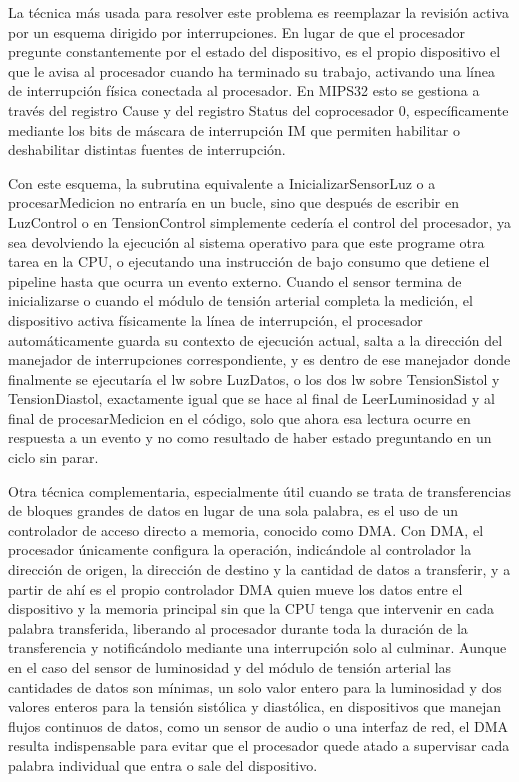 \documentclass[12pt, letterpaper]{article}
\begin{document}
La técnica más usada para resolver este problema es reemplazar la revisión activa por un esquema dirigido por interrupciones. En lugar de que el procesador pregunte constantemente por el estado del dispositivo, es el propio dispositivo el que le avisa al procesador cuando ha terminado su trabajo, activando una línea de interrupción física conectada al procesador. En MIPS32 esto se gestiona a través del registro Cause y del registro Status del coprocesador 0, específicamente mediante los bits de máscara de interrupción IM que permiten habilitar o deshabilitar distintas fuentes de interrupción.

Con este esquema, la subrutina equivalente a InicializarSensorLuz o a procesarMedicion no entraría en un bucle, sino que después de escribir en LuzControl o en TensionControl simplemente cedería el control del procesador, ya sea devolviendo la ejecución al sistema operativo para que este programe otra tarea en la CPU, o ejecutando una instrucción de bajo consumo que detiene el pipeline hasta que ocurra un evento externo. Cuando el sensor termina de inicializarse o cuando el módulo de tensión arterial completa la medición, el dispositivo activa físicamente la línea de interrupción, el procesador automáticamente guarda su contexto de ejecución actual, salta a la dirección del manejador de interrupciones correspondiente, y es dentro de ese manejador donde finalmente se ejecutaría el lw sobre LuzDatos, o los dos lw sobre TensionSistol y TensionDiastol, exactamente igual que se hace al final de LeerLuminosidad y al final de procesarMedicion en el código, solo que ahora esa lectura ocurre en respuesta a un evento y no como resultado de haber estado preguntando en un ciclo sin parar.

Otra técnica complementaria, especialmente útil cuando se trata de transferencias de bloques grandes de datos en lugar de una sola palabra, es el uso de un controlador de acceso directo a memoria, conocido como DMA. Con DMA, el procesador únicamente configura la operación, indicándole al controlador la dirección de origen, la dirección de destino y la cantidad de datos a transferir, y a partir de ahí es el propio controlador DMA quien mueve los datos entre el dispositivo y la memoria principal sin que la CPU tenga que intervenir en cada palabra transferida, liberando al procesador durante toda la duración de la transferencia y notificándolo mediante una interrupción solo al culminar. Aunque en el caso del sensor de luminosidad y del módulo de tensión arterial las cantidades de datos son mínimas, un solo valor entero para la luminosidad y dos valores enteros para la tensión sistólica y diastólica, en dispositivos que manejan flujos continuos de datos, como un sensor de audio o una interfaz de red, el DMA resulta indispensable para evitar que el procesador quede atado a supervisar cada palabra individual que entra o sale del dispositivo.
\end{document}
